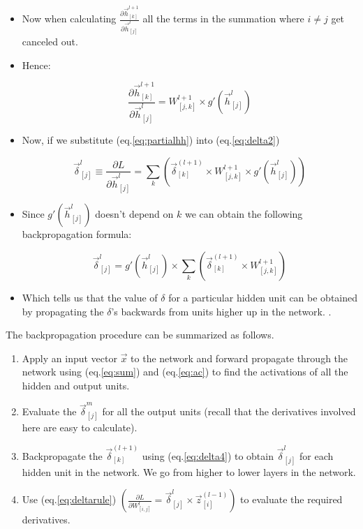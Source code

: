 \begin{itemize}
\item Now when calculating $\frac{\partial \vec{h}_{[k]}^{l+1}}{\partial \vec{h}_{[j]}^l}$ all the terms in the summation where $i \neq j$ get canceled out.   


\item Hence:

\begin{equation}
\frac{\partial \vec{h}_{[k]}^{l+1}}{\partial \vec{h}_{[j]}^l} =  W_{[j,k]}^{l+1} \times g'(\vec{h}_{[j]}^{l})
\label{eq:partialhh}
\end{equation}

\item Now, if we substitute (eq.\ref{eq:partialhh}) into (eq.\ref{eq:delta2})


 \begin{equation}
\vec{\delta}_{[j]}^l \equiv \frac{\partial L}{\partial \vec{h}_{[j]}^l} = \sum_{k} \left( \vec{\delta}_{[k]}^{(l+1)}  \times W_{[j,k]}^{l+1} \times g'(\vec{h}_{[j]}^{l}) \right)
\label{eq:delta3}
\end{equation}

\item Since $g'(\vec{h}_{[j]}^{l})$ doesn't depend on $k$ we can obtain the following backpropagation formula:

 \begin{equation}
\vec{\delta}_{[j]}^l = g'(\vec{h}_{[j]}^{l}) \times \sum_{k} \left( \vec{\delta}_{[k]}^{(l+1)}  \times W_{[j,k]}^{l+1}\right)  
\label{eq:delta4}
\end{equation}

\item Which tells us that the value of $\delta$ for a particular hidden unit can be obtained by propagating the $\delta$'s backwards from units higher up in the network. \cite{bishop2006pattern}.

\end{itemize}


The backpropagation procedure can  be summarized as follows.
\begin{enumerate}
 \item Apply an input vector $\vec{x}$  to the network and forward propagate through
the network using (eq.\ref{eq:sum}) and (eq.\ref{eq:ac}) to find the activations of all the hidden and output units.
\item Evaluate the $\vec{\delta}_{[j]}^m$ for all the output units (recall that the derivatives involved here are easy to calculate).
\item Backpropagate the $\vec{\delta}_{[k]}^{(l+1)}$ using (eq.\ref{eq:delta4}) to obtain $\vec{\delta}_{[j]}^l$ for each hidden unit in the network. We go from higher to lower layers in the network.
\item Use (eq.\ref{eq:deltarule}) $(\frac{\partial L}{\partial W_{[i,j]}^l} = \vec{\delta}_{[j]}^l \times \vec{z}_{[i]}^{(l-1)})$ to evaluate the required derivatives.
\end{enumerate}



